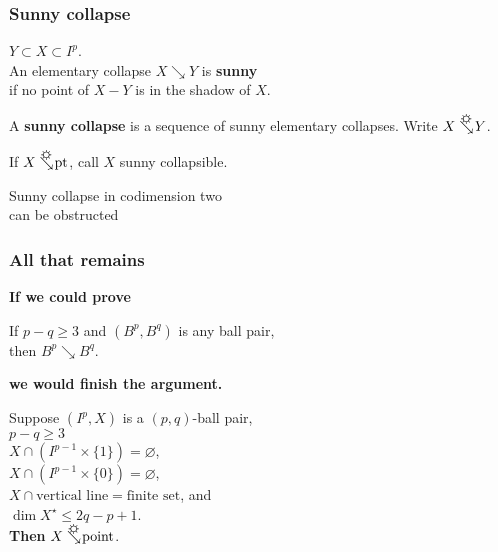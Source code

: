 \documentclass[14pt]{beamer}
\newcommand{\collapses}{\searrow}
\newcommand{\sunnycollapses}{\searrow\hspace{-12pt}\mbox{\raisebox{5pt}{\sun}}\hspace{2pt}}
\newcommand{\setbackgroundpicture}[1]{%
\usebackgroundtemplate{
\begin{pgfpicture}{0in}{0in}{\paperwidth}{\paperheight}
\pgfputat{\pgfxy(0,0)}{\texttt{[image: \#1]}}
\color{white}
\pgfsetfillopacity{0.8}
\pgfrect[fill]{\pgfxy(0,0)}{\pgfpoint{\paperwidth}{\paperheight}}
\end{pgfpicture}
}
}
\newcommand{\clearbackgroundpicture}{\usebackgroundtemplate{}}
\begin{document}
\setbackgroundpicture{sunny-street.jpg}
\begin{frame}
  \frametitle{Sunny collapse}

  $Y \subset X \subset I^p$. \\
  An elementary collapse $X \collapses Y$ is \textbf{sunny} \\
  if no point of $X - Y$ is in the shadow of $X$.

  \vfill A \textbf{sunny collapse} is a sequence of sunny elementary
  collapses.  \pause Write $X \sunnycollapses Y$.

  \vfill If $X \sunnycollapses \mbox{pt}$, call $X$ sunny collapsible.
\end{frame}
\clearbackgroundpicture

\begin{frame}
\large
\vfill
 \begin{center}
   Sunny collapse in codimension two \\
   can be obstructed
 \end{center}
 \vfill
\end{frame}


\begin{frame}
  \frametitle{All that remains}
  
  \textcolor{red!50!black}{\textbf{If we could prove}}
  \begin{lemma}
    If $p - q \geq 3$ and $(B^p,B^q)$ is any ball pair, \\
    then $B^p \collapses B^q$.
  \end{lemma}
  \textcolor{red!50!black}{\textbf{we would finish the argument.}}

  \pause
  \begin{lemma}
    Suppose $(I^p,X)$ is a $(p,q)$-ball pair,\\
    $p - q \geq 3$ \\
    $X \cap \left( I^{p-1} \times \{1\} \right) = \varnothing $, \\
    $X \cap \left( I^{p-1} \times \{0\} \right) = \varnothing $, \\
    $X \cap \mbox{vertical line} = \mbox{finite set}$, and \\
    $\dim X^\star \leq 2q - p + 1$. \\
    \textbf{Then} $X \sunnycollapses \mbox{point}$.
  \end{lemma}
\end{frame}
\end{document}
